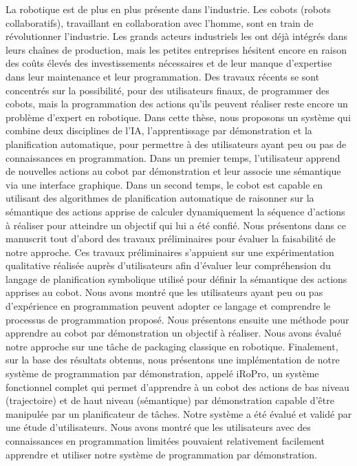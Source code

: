 La robotique est de plus en plus présente dans l’industrie. Les cobots (robots collaboratifs), travaillant en collaboration avec l’homme, sont en train de révolutionner l’industrie. Les grands acteurs industriels les ont déjà intégrés dans leurs chaînes de production, mais les petites entreprises hésitent encore en raison des coûts élevés des investissements nécessaires et de leur manque d'expertise dans leur maintenance et leur programmation. Des travaux récents se sont concentrés sur la possibilité, pour des utilisateurs finaux, de programmer des cobots, mais la programmation des actions qu'ils peuvent réaliser reste encore un problème d’expert en robotique.
Dans cette thèse, nous proposons un système qui combine deux disciplines de l'IA, l'apprentissage par démonstration et la planification automatique, pour permettre à des utilisateurs ayant peu ou pas de connaissances en programmation. Dans un premier temps, l'utilisateur apprend de nouvelles actions au cobot par démonstration et leur associe une sémantique via une interface graphique. Dans un second temps, le cobot est capable en utilisant des algorithmes de planification automatique de raisonner sur la sémantique des actions apprise de calculer dynamiquement  la séquence d’actions à réaliser pour atteindre un objectif qui lui a été confié.
Nous présentons dans ce manuscrit tout d'abord des travaux préliminaires pour évaluer la faisabilité de notre approche. Ces travaux préliminaires s’appuient sur une expérimentation qualitative réalisée auprès d'utilisateurs afin d'évaluer leur compréhension du langage de planification symbolique utilisé pour définir la sémantique des actions apprises au cobot. Nous avons montré que les utilisateurs ayant peu ou pas d'expérience en programmation peuvent adopter ce langage et comprendre le processus de programmation proposé.
Nous présentons ensuite une méthode pour apprendre au cobot par démonstration un objectif à réaliser. Nous avons évalué notre approche sur une tâche de packaging classique en robotique.
Finalement, sur la base des résultats obtenus, nous présentons une implémentation de notre système de programmation par démonstration, appelé iRoPro, un système fonctionnel complet qui permet d'apprendre à un cobot des actions de bas niveau (trajectoire) et de haut niveau (sémantique) par démonstration capable d’être manipulée par un planificateur de tâches.  Notre système a été évalué  et validé par une étude d’utilisateurs. Nous avons montré que les utilisateurs avec des connaissances en programmation limitées pouvaient relativement facilement apprendre et utiliser notre système de programmation par démonstration.